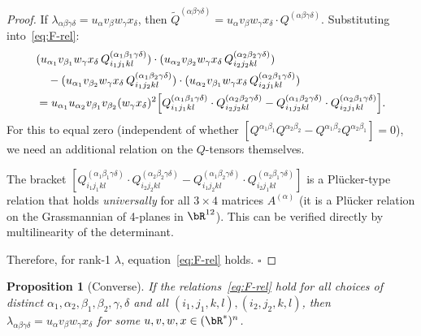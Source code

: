 \documentclass[12pt]{article}
\newtheorem{proposition}[theorem]{Proposition}
\begin{document}
\begin{proof}
If $\lambda_{\alpha\beta\gamma\delta} = u_\alpha v_\beta w_\gamma x_\delta$, then $\tilde{Q}^{(\alpha\beta\gamma\delta)} = u_\alpha v_\beta w_\gamma x_\delta \cdot Q^{(\alpha\beta\gamma\delta)}$.  Substituting into~\eqref{eq:F-rel}:
\begin{align*}
  &(u_{\alpha_1}v_{\beta_1}w_\gamma x_\delta\,Q^{(\alpha_1\beta_1\gamma\delta)}_{i_1j_1kl})
  \cdot(u_{\alpha_2}v_{\beta_2}w_\gamma x_\delta\,Q^{(\alpha_2\beta_2\gamma\delta)}_{i_2j_2kl})\\
  &\quad-(u_{\alpha_1}v_{\beta_2}w_\gamma x_\delta\,Q^{(\alpha_1\beta_2\gamma\delta)}_{i_1j_2kl})
  \cdot(u_{\alpha_2}v_{\beta_1}w_\gamma x_\delta\,Q^{(\alpha_2\beta_1\gamma\delta)}_{i_2j_1kl})\\
  &= u_{\alpha_1}u_{\alpha_2}v_{\beta_1}v_{\beta_2}(w_\gamma x_\delta)^2
    \Bigl[Q^{(\alpha_1\beta_1\gamma\delta)}_{i_1j_1kl}\cdot Q^{(\alpha_2\beta_2\gamma\delta)}_{i_2j_2kl}
    - Q^{(\alpha_1\beta_2\gamma\delta)}_{i_1j_2kl}\cdot Q^{(\alpha_2\beta_1\gamma\delta)}_{i_2j_1kl}\Bigr].
\end{align*}
For this to equal zero (independent of whether $[Q^{\alpha_1\beta_1}Q^{\alpha_2\beta_2} - Q^{\alpha_1\beta_2}Q^{\alpha_2\beta_1}]=0$), we need an additional relation on the $Q$-tensors themselves.

The bracket $[Q^{(\alpha_1\beta_1\gamma\delta)}_{i_1j_1kl}\cdot Q^{(\alpha_2\beta_2\gamma\delta)}_{i_2j_2kl} - Q^{(\alpha_1\beta_2\gamma\delta)}_{i_1j_2kl}\cdot Q^{(\alpha_2\beta_1\gamma\delta)}_{i_2j_1kl}]$ is a Pl{\"u}cker-type relation that holds \emph{universally} for all $3\times 4$ matrices $A^{(\alpha)}$ (it is a Pl{\"u}cker relation on the Grassmannian of 4-planes in $\bR^{12}$). This can be verified directly by multilinearity of the determinant.

Therefore, for rank-1 $\lambda$, equation~\eqref{eq:F-rel} holds. \hfill$\square$
\end{proof}

\begin{proposition}[Converse]
  If the relations~\eqref{eq:F-rel} hold for all choices of distinct $\alpha_1,\alpha_2,\beta_1,\beta_2,\gamma,\delta$ and all $(i_1,j_1,k,l),(i_2,j_2,k,l)$, then $\lambda_{\alpha\beta\gamma\delta} = u_\alpha v_\beta w_\gamma x_\delta$ for some $u,v,w,x\in(\bR^*)^n$.
\end{proposition}
\end{document}
